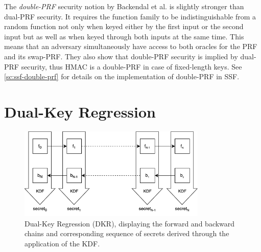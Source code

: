 The \textit{double-PRF} security notion by Backendal et al.
is slightly stronger than dual-PRF security.
It requires the function family to be indistinguishable from a random 
function not only when keyed either by the first input or the second input
but as well as when keyed through both inputs at the same time.
This means that an adversary simultaneously have access to both 
oracles for the PRF and its swap-PRF.
They also show that double-PRF security is implied by dual-PRF security,
thus HMAC is a double-PRF in case of fixed-length keys.
See \cref{sc:ssf-double-prf} for details on the implementation of double-PRF in SSF.

\section{Dual-Key Regression}\label{sc:DKR}

\begin{figure}
    \centering
    \includegraphics[width=0.8\textwidth]{figures/dkr.drawio.png}
    \caption{Dual-Key Regression (DKR), displaying the forward and backward chains and corresponding sequence of secrets derived through the application of the KDF. }
    \label{fig:dkr}
\end{figure}


